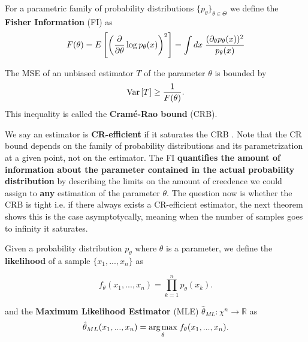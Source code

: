 \begin{definition}
  For a parametric family of probability distributions $\{p_{\theta}\}_{\theta \in \Theta}$ we define the \textbf{Fisher Information} (FI)
  as
  \begin{equation}
    F(\theta) = E\left[\left(\frac{\partial}{\partial \theta}\log{p_{\theta}(x)} \right)^{2}\right] = \int dx \hspace{0.1cm} \frac{(\partial_{\theta} p_{\theta}(x))^{2}}{p_{\theta}(x)}
  \end{equation}
\end{definition}


\begin{theorem}
  The MSE of an unbiased estimator $T$ of the parameter $\theta$ is bounded by
  \begin{equation}
    \text{Var}\left[T\right]\geq \frac{1}{F(\theta)}.
  \end{equation}
  This inequality is called the \textbf{Cram\'e-Rao bound} (CRB).
\end{theorem}

We say an estimator is \textbf{CR-efficient} if it saturates the CRB \cite{cover_elements_2006,wiseman_quantum_2010}. Note that the CR bound
depends on the family of probability distributions and its parametrization at a given point, not on the estimator. The FI \textbf{quantifies the
  amount of information about the parameter contained in the actual probability distribution} by describing the limits on the amount of
creedence we could assign to \textbf{any} estimation of the parameter $\theta$. The question now is whether the CRB is tight i.e. if there
always exists a CR-efficient estimator, the next theorem shows this is the case asymptotycally, meaning when the number of samples goes to
infinity it saturates.

\begin{definition}
  Given a probability distribution $p_{\theta}$ where $\theta$ is a parameter, we define the \textbf{likelihood} of a sample $\{x_{1},...,x_{n}\}$
  as

  \begin{equation*}
    f_{\theta}(x_{1},...,x_{n}) = \prod_{k=1}^{n}p_{\theta}(x_{k}).
  \end{equation*}

  and the \textbf{Maximum Likelihood Estimator} (MLE)  $\hat{\theta}_{ML} : \chi^{n} \to \mathds{R}$ as
  \begin{equation*}
    \hat{\theta}_{ML}(x_{1}, ..., x_{n}) = \underset{\theta}{\text{arg\hspace{0.05cm}max}}\hspace{0.1cm} f_{\theta}(x_{1},...,x_{n}).
  \end{equation*}

\end{definition}

